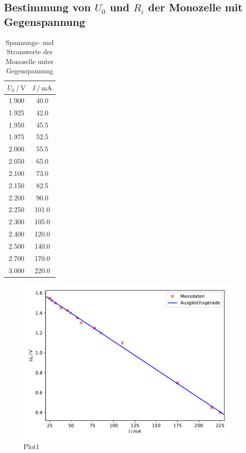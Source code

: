 \subsection{Bestimmung von $U_0$ und $R_i$ der Monozelle 
            mit Gegenspannung}
\begin{table}
  \centering
  \caption{Spannungs- und Stromwerte der Monozelle unter 
           Gegenspannung}
  \label{tab:Gegen}
  \begin{tabular}{c c}
    \toprule
     $U_k \,/\, \si{\volt}$ & $I \,/\, \si{\milli\ampere}$\\
    \midrule
      1.900 &  40.0\\
      1.925 &  42.0\\
      1.950 &  45.5\\
      1.975 &  52.5\\
      2.000 &  55.5\\
      2.050 &  65.0\\
      2.100 &  73.0\\
      2.150 &  82.5\\
      2.200 &  90.0\\
      2.250 & 101.0\\
      2.300 & 105.0\\
      2.400 & 120.0\\
      2.500 & 140.0\\
      2.700 & 170.0\\
      3.000 & 220.0\\
    \bottomrule
  \end{tabular}
\end{table}


\begin{figure}
  \centering
  \includegraphics{plot1.pdf}
  \caption{Plot1}
  \label{fig:plot1}
\end{figure}

